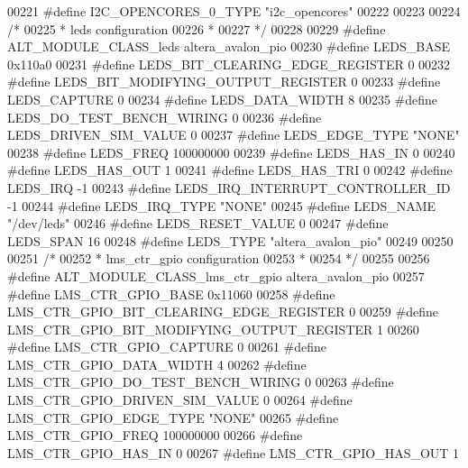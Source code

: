 \begin{DoxyCode}
00221 \textcolor{preprocessor}{#define I2C\_OPENCORES\_0\_TYPE "i2c\_opencores"}
00222 
00223 
00224 \textcolor{comment}{/*}
00225 \textcolor{comment}{ * leds configuration}
00226 \textcolor{comment}{ *}
00227 \textcolor{comment}{ */}
00228 
00229 \textcolor{preprocessor}{#define ALT\_MODULE\_CLASS\_leds altera\_avalon\_pio}
00230 \textcolor{preprocessor}{#define LEDS\_BASE 0x110a0}
00231 \textcolor{preprocessor}{#define LEDS\_BIT\_CLEARING\_EDGE\_REGISTER 0}
00232 \textcolor{preprocessor}{#define LEDS\_BIT\_MODIFYING\_OUTPUT\_REGISTER 0}
00233 \textcolor{preprocessor}{#define LEDS\_CAPTURE 0}
00234 \textcolor{preprocessor}{#define LEDS\_DATA\_WIDTH 8}
00235 \textcolor{preprocessor}{#define LEDS\_DO\_TEST\_BENCH\_WIRING 0}
00236 \textcolor{preprocessor}{#define LEDS\_DRIVEN\_SIM\_VALUE 0}
00237 \textcolor{preprocessor}{#define LEDS\_EDGE\_TYPE "NONE"}
00238 \textcolor{preprocessor}{#define LEDS\_FREQ 100000000}
00239 \textcolor{preprocessor}{#define LEDS\_HAS\_IN 0}
00240 \textcolor{preprocessor}{#define LEDS\_HAS\_OUT 1}
00241 \textcolor{preprocessor}{#define LEDS\_HAS\_TRI 0}
00242 \textcolor{preprocessor}{#define LEDS\_IRQ -1}
00243 \textcolor{preprocessor}{#define LEDS\_IRQ\_INTERRUPT\_CONTROLLER\_ID -1}
00244 \textcolor{preprocessor}{#define LEDS\_IRQ\_TYPE "NONE"}
00245 \textcolor{preprocessor}{#define LEDS\_NAME "/dev/leds"}
00246 \textcolor{preprocessor}{#define LEDS\_RESET\_VALUE 0}
00247 \textcolor{preprocessor}{#define LEDS\_SPAN 16}
00248 \textcolor{preprocessor}{#define LEDS\_TYPE "altera\_avalon\_pio"}
00249 
00250 
00251 \textcolor{comment}{/*}
00252 \textcolor{comment}{ * lms\_ctr\_gpio configuration}
00253 \textcolor{comment}{ *}
00254 \textcolor{comment}{ */}
00255 
00256 \textcolor{preprocessor}{#define ALT\_MODULE\_CLASS\_lms\_ctr\_gpio altera\_avalon\_pio}
00257 \textcolor{preprocessor}{#define LMS\_CTR\_GPIO\_BASE 0x11060}
00258 \textcolor{preprocessor}{#define LMS\_CTR\_GPIO\_BIT\_CLEARING\_EDGE\_REGISTER 0}
00259 \textcolor{preprocessor}{#define LMS\_CTR\_GPIO\_BIT\_MODIFYING\_OUTPUT\_REGISTER 1}
00260 \textcolor{preprocessor}{#define LMS\_CTR\_GPIO\_CAPTURE 0}
00261 \textcolor{preprocessor}{#define LMS\_CTR\_GPIO\_DATA\_WIDTH 4}
00262 \textcolor{preprocessor}{#define LMS\_CTR\_GPIO\_DO\_TEST\_BENCH\_WIRING 0}
00263 \textcolor{preprocessor}{#define LMS\_CTR\_GPIO\_DRIVEN\_SIM\_VALUE 0}
00264 \textcolor{preprocessor}{#define LMS\_CTR\_GPIO\_EDGE\_TYPE "NONE"}
00265 \textcolor{preprocessor}{#define LMS\_CTR\_GPIO\_FREQ 100000000}
00266 \textcolor{preprocessor}{#define LMS\_CTR\_GPIO\_HAS\_IN 0}
00267 \textcolor{preprocessor}{#define LMS\_CTR\_GPIO\_HAS\_OUT 1}

\end{DoxyCode}

